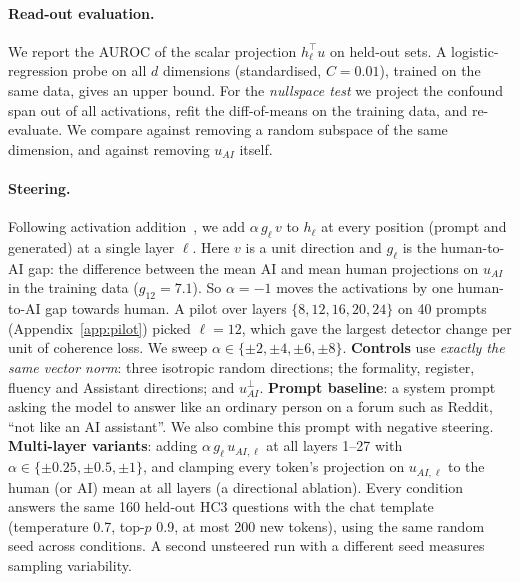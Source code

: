 \paragraph{Read-out evaluation.} We report the AUROC of the scalar projection $h_\ell^\top u$ on held-out sets. A logistic-regression probe on all $d$ dimensions (standardised, $C{=}0.01$), trained on the same data, gives an upper bound. For the \emph{nullspace test} we project the confound span out of all activations, refit the diff-of-means on the training data, and re-evaluate. We compare against removing a random subspace of the same dimension, and against removing $u_{AI}$ itself.

\paragraph{Steering.} Following activation addition~\citep{turner2023steering}, we add $\alpha\, g_\ell\, v$ to $h_\ell$ at every position (prompt and generated) at a single layer $\ell$. Here $v$ is a unit direction and $g_\ell$ is the human-to-AI gap: the difference between the mean AI and mean human projections on $u_{AI}$ in the training data ($g_{12}{=}7.1$). So $\alpha{=}{-}1$ moves the activations by one human-to-AI gap towards human. A pilot over layers $\{8,12,16,20,24\}$ on 40 prompts (Appendix~\ref{app:pilot}) picked $\ell{=}12$, which gave the largest detector change per unit of coherence loss. We sweep $\alpha\in\{\pm2,\pm4,\pm6,\pm8\}$.
\textbf{Controls} use \emph{exactly the same vector norm}: three isotropic random directions; the formality, register, fluency and Assistant directions; and $u_{AI}^{\perp}$.
\textbf{Prompt baseline}: a system prompt asking the model to answer like an ordinary person on a forum such as Reddit, ``not like an AI assistant''. We also combine this prompt with negative steering.
\textbf{Multi-layer variants}: adding $\alpha\, g_\ell\, u_{AI,\ell}$ at all layers 1--27 with $\alpha\in\{\pm0.25,\pm0.5,\pm1\}$, and clamping every token's projection on $u_{AI,\ell}$ to the human (or AI) mean at all layers (a directional ablation).
Every condition answers the same 160 held-out HC3 questions with the chat template (temperature 0.7, top-$p$ 0.9, at most 200 new tokens), using the same random seed across conditions. A second unsteered run with a different seed measures sampling variability.

